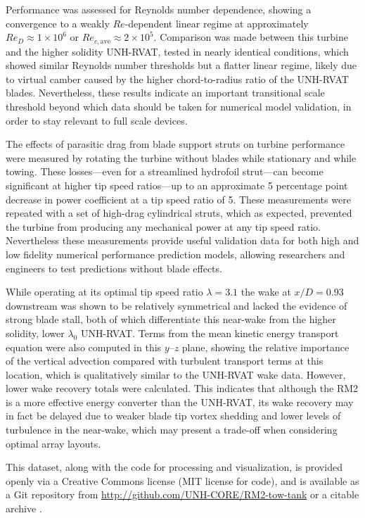 \documentclass[10pt,letterpaper]{article}
\begin{document}
Performance was assessed for Reynolds number dependence, showing a convergence
to a weakly $Re$-dependent linear regime at approximately $Re_D \approx 1 \times
10^6$ or $Re_{c,\mathrm{ave}} \approx 2 \times 10^5$. Comparison was made
between this turbine and the higher solidity UNH-RVAT, tested in nearly
identical conditions, which showed similar Reynolds number thresholds but a
flatter linear regime, likely due to virtual camber caused by the higher
chord-to-radius ratio of the UNH-RVAT blades. Nevertheless, these results
indicate an important transitional scale threshold beyond which data should be
taken for numerical model validation, in order to stay relevant to full scale
devices.

The effects of parasitic drag from blade support struts on turbine performance
were measured by rotating the turbine without blades while stationary and while
towing. These losses---even for a streamlined hydrofoil strut---can become
significant at higher tip speed ratios---up to an approximate 5 percentage point
decrease in power coefficient at a tip speed ratio of 5. These measurements were
repeated with a set of high-drag cylindrical struts, which as expected,
prevented the turbine from producing any mechanical power at any tip speed
ratio. Nevertheless these measurements provide useful validation data for both
high and low fidelity numerical performance prediction models, allowing
researchers and engineers to test predictions without blade effects.

While operating at its optimal tip speed ratio $\lambda=3.1$ the wake at
$x/D=0.93$ downstream was shown to be relatively symmetrical and lacked the
evidence of strong blade stall, both of which differentiate this near-wake from
the higher solidity, lower $\lambda_0$ UNH-RVAT. Terms from the mean kinetic
energy transport equation were also computed in this $y$--$z$ plane, showing the
relative importance of the vertical advection compared with turbulent transport
terms at this location, which is qualitatively similar to the UNH-RVAT wake
data. However, lower wake recovery totals were calculated. This indicates that
although the RM2 is a more effective energy converter than the UNH-RVAT, its
wake recovery may in fact be delayed due to weaker blade tip vortex shedding and
lower levels of turbulence in the near-wake, which may present a trade-off when
considering optimal array layouts.

This dataset, along with the code for processing and visualization, is provided
openly via a Creative Commons license (MIT license for code), and is available
as a Git repository from \url{http://github.com/UNH-CORE/RM2-tow-tank} or a
citable archive \cite{Bachant2016-RM2-data}.
\end{document}

